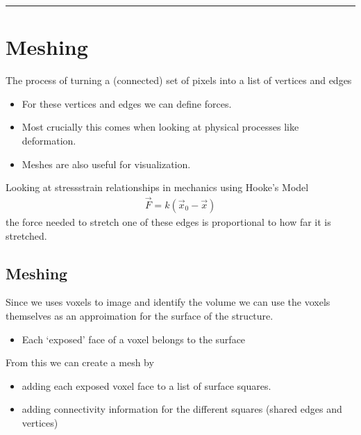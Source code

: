 \documentclass[letterpaper,10pt,english]{sphinxmanual}
\begin{document}
\bigskip\hrule\bigskip



\chapter{Meshing}
\label{\detokenize{06-ShapeAnalysis:meshing}}
\sphinxAtStartPar
The process of turning a (connected) set of pixels into a list of vertices and edges
\begin{itemize}
\item {} 
\sphinxAtStartPar
For these vertices and edges we can define forces.

\item {} 
\sphinxAtStartPar
Most crucially this comes when looking at physical processes like deformation.

\item {} 
\sphinxAtStartPar
Meshes are also useful for visualization.

\end{itemize}

\sphinxAtStartPar
{}

\sphinxAtStartPar
Looking at stress\sphinxhyphen{}strain relationships in mechanics using Hooke’s Model
\begin{equation*}
\begin{split} \vec{F}=k (\vec{x}_0-\vec{x}) \end{split}
\end{equation*}
\sphinxAtStartPar
the force needed to stretch one of these edges is proportional to how far it is stretched.


\section{Meshing}
\label{\detokenize{06-ShapeAnalysis:id5}}
\sphinxAtStartPar
Since we uses voxels to image and identify the volume we can use the voxels themselves as an approimation for the surface of the structure.
\begin{itemize}
\item {} 
\sphinxAtStartPar
Each ‘exposed’ face of a voxel belongs to the surface

\end{itemize}

\sphinxAtStartPar
From this we can create a mesh by
\begin{itemize}
\item {} 
\sphinxAtStartPar
adding each exposed voxel face to a list of surface squares.

\item {} 
\sphinxAtStartPar
adding connectivity information for the different squares (shared edges and vertices)

\end{itemize}
\end{document}
